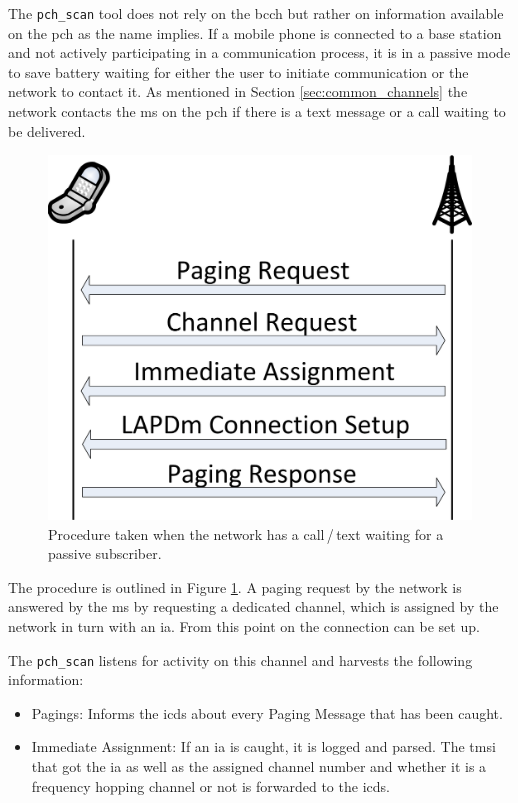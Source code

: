 The \texttt{pch\_scan} tool does not rely on the \gls{bcch} but rather on information available on the \gls{pch} as the name implies.
If a mobile phone is connected to a base station and not actively participating in a communication process, it is in a passive mode to save battery waiting for either the user to initiate communication or the network to contact it.
As mentioned in Section \ref{sec:common_channels} the network contacts the \gls{ms} on the \gls{pch} if there is a text message or a call waiting to be delivered.
\begin{figure}
\centering
\includegraphics{../Images/Paging}
\caption{Procedure taken when the network has a call\,/\,text waiting for a passive subscriber.}
\label{fig:paging}
\end{figure}
The procedure is outlined in Figure \ref{fig:paging}.
A paging request by the network is answered by the \gls{ms} by requesting a dedicated channel, which is assigned by the network in turn with an \gls{ia}.
From this point on the connection can be set up.

The \texttt{pch\_scan} listens for activity on this channel and harvests the following information:
\begin{itemize}
	\item Pagings: Informs the \gls{icds} about every Paging Message that has been caught.
	\item Immediate Assignment: If an \gls{ia} is caught, it is logged and parsed.
	The \gls{tmsi} that got the \gls{ia} as well as the assigned channel number and whether it is a frequency hopping channel or not is forwarded to the \gls{icds}.
\end{itemize}

